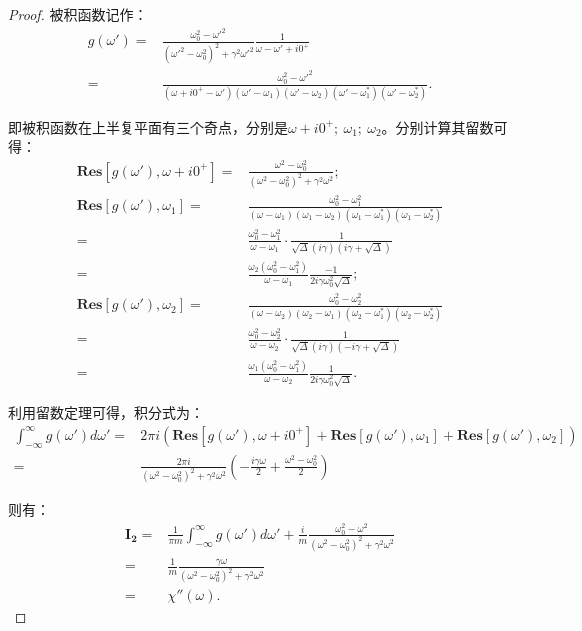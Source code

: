\documentclass[reqno,a4paper,12pt]{amsart}
\begin{document}
\begin{proof}
被积函数记作：
\begin{align*}
	g(\omega') =& \frac{\omega_0^2-\omega'^2}{(\omega'^2-\omega_0^2)^2 + \gamma^2\omega'^2} \frac{1}{\omega-\omega'+i0^+} \\
	=& \frac{\omega_0^2-\omega'^2}{(\omega+i0^+-\omega')(\omega'-\omega_1)(\omega'-\omega_2)(\omega'-\omega_1^*)(\omega'-\omega_2^*)}.
\end{align*}

即被积函数在上半复平面有三个奇点，分别是$\omega+i0^+; \ \omega_1; \ \omega_2$。分别计算其留数可得：
\begin{align*}
	\mathbf{Res}[g(\omega'), \omega+i0^+] =& \frac{\omega^2 - \omega_0^2}{(\omega^2-\omega_0^2)^2 + \gamma^2\omega^2}; \\
	\mathbf{Res}[g(\omega'), \omega_1] =& \frac{\omega_0^2 - \omega_1^2}{(\omega-\omega_1)(\omega_1-\omega_2)(\omega_1-\omega_1^*)(\omega_1-\omega_2^*)} \\
	=& \frac{\omega_0^2 - \omega_1^2}{\omega-\omega_1} \cdot \frac{1}{\sqrt{\Delta} (i\gamma)(i\gamma+\sqrt{\Delta})} \\
	=& \frac{\omega_2(\omega_0^2 - \omega_1^2)}{\omega-\omega_1} \frac{-1}{2i\gamma\omega_0^2\sqrt{\Delta}}; \\
	\mathbf{Res}[g(\omega'), \omega_2] =& \frac{\omega_0^2 - \omega_2^2}{(\omega-\omega_2)(\omega_2-\omega_1)(\omega_2-\omega_1^*)(\omega_2-\omega_2^*)} \\
	=& \frac{\omega_0^2 - \omega_2^2}{\omega-\omega_2} \cdot \frac{1}{\sqrt{\Delta} (i\gamma)(-i\gamma+\sqrt{\Delta})} \\
	=& \frac{\omega_1(\omega_0^2 - \omega_1^2)}{\omega-\omega_2} \frac{1}{2i\gamma\omega_0^2\sqrt{\Delta}}.
\end{align*}

利用留数定理可得，积分式为：
\begin{align*}
	\int_{-\infty}^\infty g(\omega') d\omega' =& 2\pi i(\mathbf{Res}[g(\omega'), \omega+i0^+] + \mathbf{Res}[g(\omega'), \omega_1] + \mathbf{Res}[g(\omega'), \omega_2]) \\
	=& \frac{2\pi i}{(\omega^2-\omega_0^2)^2 + \gamma^2\omega^2} \left( -\frac{i\gamma\omega}{2} + \frac{\omega^2-\omega_0^2}{2} \right)
\end{align*}

则有：
\begin{align*}
	\mathbf{I_2} =& \frac{1}{\pi m} \int_{-\infty}^\infty g(\omega') d\omega' + \frac{i}{m}\frac{\omega_0^2-\omega^2}{(\omega^2-\omega_0^2)^2 + \gamma^2\omega^2} \\
	=& \frac{1}{m} \frac{\gamma\omega}{(\omega^2-\omega_0^2)^2 + \gamma^2\omega^2} \\
	=& \chi''(\omega).
\end{align*}

\end{proof}
\end{document}
